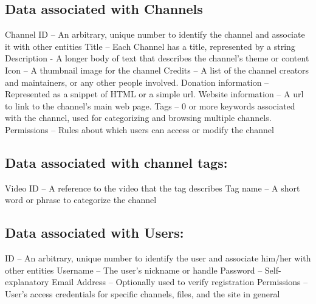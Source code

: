\documentclass[a4paper,12pt]{report}
\begin{document}
\subsection{Data associated with Channels}
Channel ID – An arbitrary, unique number to identify the channel and  associate it with other entities
Title – Each Channel has a title, represented by a string
Description - A longer body of text that describes the channel's theme or content
Icon – A thumbnail image for the channel
Credits – A list of the channel creators and maintainers, or any other people involved. 
Donation information – Represented as a snippet of HTML or a simple url.
Website information – A url to link to the channel's main web page.
Tags – 0 or more keywords associated with the channel, used for categorizing and browsing multiple channels.
Permissions – Rules about which users can access or modify the channel

\subsection{Data associated with channel tags:}
Video ID – A reference to the video that the tag describes
Tag name – A short word or phrase to categorize the channel

\subsection{Data associated with Users:}
ID – An arbitrary, unique number to identify the user and associate him/her with other entities
Username – The user's nickname or handle
Password – Self-explanatory
Email Address – Optionally used to verify registration
Permissions – User's access credentials for specific channels, files, and the site in general
\end{document}

